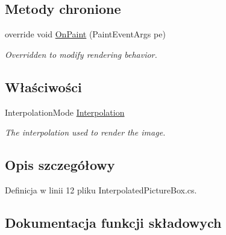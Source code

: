 \subsection*{Metody chronione}
\begin{DoxyCompactItemize}
\item 
override void \hyperlink{class_convay_1_1_win_forms_game_1_1_interpolated_picture_box_afc93caae6262a1460b02b2495976dd4e}{On\+Paint} (Paint\+Event\+Args pe)
\begin{DoxyCompactList}\small\item\em Overridden to modify rendering behavior. \end{DoxyCompactList}\end{DoxyCompactItemize}
\subsection*{Właściwości}
\begin{DoxyCompactItemize}
\item 
Interpolation\+Mode \hyperlink{class_convay_1_1_win_forms_game_1_1_interpolated_picture_box_ae3ca4b6ef461db4055b7cbe577b15432}{Interpolation}
\begin{DoxyCompactList}\small\item\em The interpolation used to render the image. \end{DoxyCompactList}\end{DoxyCompactItemize}


\subsection{Opis szczegółowy}


Definicja w linii 12 pliku Interpolated\+Picture\+Box.\+cs.



\subsection{Dokumentacja funkcji składowych}
\hypertarget{class_convay_1_1_win_forms_game_1_1_interpolated_picture_box_afc93caae6262a1460b02b2495976dd4e}{}\label{class_convay_1_1_win_forms_game_1_1_interpolated_picture_box_afc93caae6262a1460b02b2495976dd4e} 
